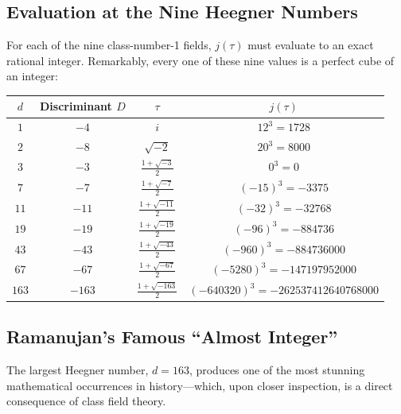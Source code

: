 \documentclass[a4paper]{article}
\begin{document}
\subsection{Evaluation at the Nine Heegner Numbers}
For each of the nine class-number-1 fields, $j(\tau)$ must evaluate to an exact rational integer. Remarkably, every one of these nine values is a perfect cube of an integer:
\begin{center}
\begin{tabular}{c c c c}
\toprule
$d$ & Discriminant $D$ & $\tau$ & $j(\tau)$ \\
\midrule
$1$ & $-4$ & $i$ & $12^3 = 1728$ \\
$2$ & $-8$ & $\sqrt{-2}$ & $20^3 = 8000$ \\
$3$ & $-3$ & $\frac{1+\sqrt{-3}}{2}$ & $0^3 = 0$ \\
$7$ & $-7$ & $\frac{1+\sqrt{-7}}{2}$ & $(-15)^3 = -3375$ \\
$11$ & $-11$ & $\frac{1+\sqrt{-11}}{2}$ & $(-32)^3 = -32768$ \\
$19$ & $-19$ & $\frac{1+\sqrt{-19}}{2}$ & $(-96)^3 = -884736$ \\
$43$ & $-43$ & $\frac{1+\sqrt{-43}}{2}$ & $(-960)^3 = -884736000$ \\
$67$ & $-67$ & $\frac{1+\sqrt{-67}}{2}$ & $(-5280)^3 = -147197952000$ \\
$163$ & $-163$ & $\frac{1+\sqrt{-163}}{2}$ & $(-640320)^3 = -262537412640768000$ \\
\bottomrule
\end{tabular}
\end{center}

\subsection{Ramanujan's Famous ``Almost Integer''}
The largest Heegner number, $d = 163$, produces one of the most stunning mathematical occurrences in history---which, upon closer inspection, is a direct consequence of class field theory.
\end{document}
